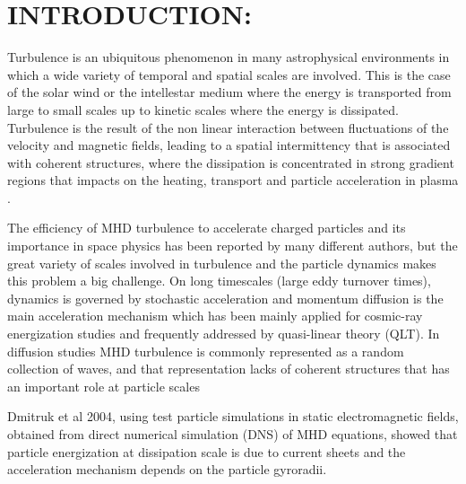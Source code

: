 \documentclass[%
aip,pop,amsmath,amssymb,
 reprint,%
]{revtex4-1}
\begin{document}
%

\section{\label{sec:level1}INTRODUCTION:}
Turbulence is an ubiquitous phenomenon in many astrophysical 
environments in which a wide  
variety of temporal and spatial scales are involved. This is the case of 
the solar wind or the 
intellestar medium where the energy is transported from 
large to small scales up to 
kinetic scales where the energy is dissipated. 
Turbulence is the result of the  non linear 
interaction between fluctuations of the velocity and magnetic fields, 
leading to a 
spatial intermittency that is associated with coherent structures,
 where the dissipation is 
concentrated in strong gradient regions that impacts on the heating, 
transport and particle 
acceleration in plasma \cite{M1}.

The efficiency of MHD turbulence to accelerate charged particles 
and its importance in space 
physics has been reported by many different authors\cite{F1,L1,M2}, 
but the great variety of 
scales involved in turbulence and the particle dynamics
makes this problem a big challenge.
On long timescales (large eddy turnover times), dynamics is
governed by stochastic acceleration and momentum diffusion is
the main acceleration 
mechanism which has been mainly applied for cosmic-ray energization 
studies and frequently
addressed by quasi-linear theory (QLT)\cite{S1,CH1,Lange1}. 
In diffusion studies 
MHD turbulence is commonly represented as a random 
collection of waves, and that 
representation lacks of coherent structures that has an important role 
at particle scales\cite{Vlahos}

Dmitruk et al 2004\cite{PD1}, 
using test particle simulations in static electromagnetic fields, obtained 
from direct 
numerical simulation (DNS) of MHD equations, showed that particle 
energization at dissipation
scale is due to current sheets and the acceleration mechanism 
depends on the particle 
gyroradii. 
\end{document}

